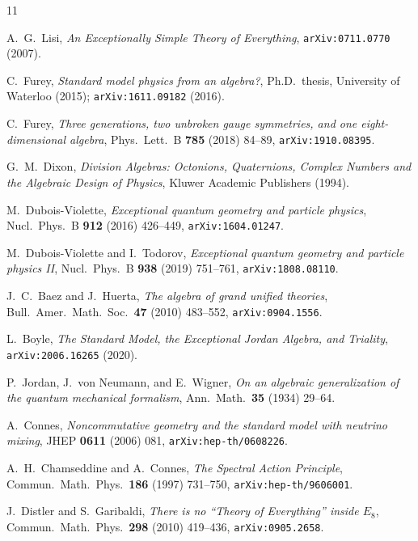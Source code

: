 \documentclass[11pt,a4paper]{article}
\theoremstyle{plain}
\begin{document}
\begin{thebibliography}{11}

A.~G.~Lisi,
\emph{An Exceptionally Simple Theory of Everything},
\texttt{arXiv:0711.0770} (2007).

C.~Furey,
\emph{Standard model physics from an algebra?},
Ph.D.\ thesis, University of Waterloo (2015); \texttt{arXiv:1611.09182} (2016).

C.~Furey,
\emph{Three generations, two unbroken gauge symmetries, and one
eight-dimensional algebra},
Phys.\ Lett.\ B \textbf{785} (2018) 84--89, \texttt{arXiv:1910.08395}.

G.~M.~Dixon,
\emph{Division Algebras: Octonions, Quaternions, Complex Numbers and the
Algebraic Design of Physics},
Kluwer Academic Publishers (1994).

M.~Dubois-Violette,
\emph{Exceptional quantum geometry and particle physics},
Nucl.\ Phys.\ B \textbf{912} (2016) 426--449, \texttt{arXiv:1604.01247}.

M.~Dubois-Violette and I.~Todorov,
\emph{Exceptional quantum geometry and particle physics II},
Nucl.\ Phys.\ B \textbf{938} (2019) 751--761, \texttt{arXiv:1808.08110}.

J.~C.~Baez and J.~Huerta,
\emph{The algebra of grand unified theories},
Bull.\ Amer.\ Math.\ Soc.\ \textbf{47} (2010) 483--552, \texttt{arXiv:0904.1556}.

L.~Boyle,
\emph{The Standard Model, the Exceptional Jordan Algebra, and Triality},
\texttt{arXiv:2006.16265} (2020).

P.~Jordan, J.~von Neumann, and E.~Wigner,
\emph{On an algebraic generalization of the quantum mechanical formalism},
Ann.\ Math.\ \textbf{35} (1934) 29--64.

A.~Connes,
\emph{Noncommutative geometry and the standard model with neutrino mixing},
JHEP \textbf{0611} (2006) 081, \texttt{arXiv:hep-th/0608226}.

A.~H.~Chamseddine and A.~Connes,
\emph{The Spectral Action Principle},
Commun.\ Math.\ Phys.\ \textbf{186} (1997) 731--750, \texttt{arXiv:hep-th/9606001}.

J.~Distler and S.~Garibaldi,
\emph{There is no ``Theory of Everything'' inside $E_8$},
Commun.\ Math.\ Phys.\ \textbf{298} (2010) 419--436, \texttt{arXiv:0905.2658}.

\end{thebibliography}
\end{document}
